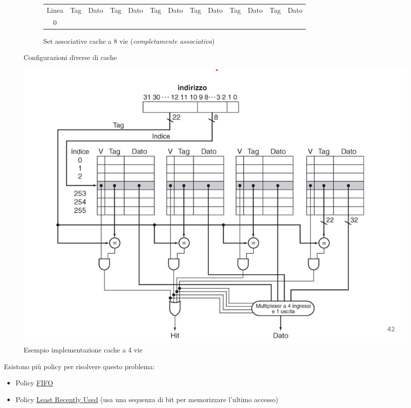 \begin{figure}[H]
\begin{subfigure}{\textwidth}
\begin{center}
\begin{tabular}{ccccccccccccc}
				Linea                  & Tag                   & Dato                  & Tag                   & Dato                  & Tag                   & Dato                  & Tag                   & Dato                  & Tag                   & Dato                  & Tag                   & Dato                  \\ \cline{2-13}
				\multicolumn{1}{c|}{0} & \multicolumn{1}{c|}{} & \multicolumn{1}{c|}{} & \multicolumn{1}{c|}{} & \multicolumn{1}{c|}{} & \multicolumn{1}{c|}{} & \multicolumn{1}{c|}{} & \multicolumn{1}{c|}{} & \multicolumn{1}{c|}{} & \multicolumn{1}{c|}{} & \multicolumn{1}{c|}{} & \multicolumn{1}{c|}{} & \multicolumn{1}{c|}{} \\ \cline{2-13}
			\end{tabular}
		\end{center}
		\caption{Set associative cache a 8 vie (\textit{completamente associativa})}
	\end{subfigure}
	\caption{Configurazioni diverse di cache}
\end{figure}
\begin{figure}[H]
	\includegraphics[width = \textwidth]{Images/cache a 4 vide.png }
	\caption{Esempio implementazione cache a 4 vie}
\end{figure}
Esistono più policy per risolvere questo problema:
\begin{itemize}
	\item Policy \underline{FIFO}
	\item Policy \underline{Least Recently Used} (usa una sequenza di bit per memorizzare l'ultimo accesso)
\end{itemize}
